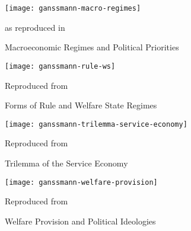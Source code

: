 
 \begin{figure}[htbp]
	\centering
	\texttt{[image: ganssmann-macro-regimes]}
	\caption{Macroeconomic Regimes and Political Priorities}
	\label{fig:ganssmann-macro-regimes}
	\begin{flushleft}
		\scriptsize{\cite{Rodrik2002} as reproduced in \citet[348]{Ganssmann2010}}
	\end{flushleft}
\end{figure}

\begin{figure}[htbp]
	\centering
	\texttt{[image: ganssmann-rule-ws]}
	\caption{Forms of Rule and Welfare State Regimes}
	\label{fig:ganssmann-rule-ws}
	\begin{flushleft}
		\scriptsize{Reproduced from \citet[334]{Ganssmann2010}}
	\end{flushleft}
\end{figure}

\begin{figure}[htbp]
	\centering
	\texttt{[image: ganssmann-trilemma-service-economy]}
	\caption{Trilemma of the Service Economy}
	\label{fig:ganssmann-trilemma-service-economy}
	\begin{flushleft}
		\scriptsize{Reproduced from \citet[341]{Ganssmann2010}}
	\end{flushleft}
\end{figure}

\begin{figure}[htbp]
	\centering
	\texttt{[image: ganssmann-welfare-provision]}
	\caption{Welfare Provision and Political Ideologies}
	\label{fig:ganssmann-welfare-provision}
	\begin{flushleft}
		\scriptsize{Reproduced from \citet[334]{Ganssmann2010}}
	\end{flushleft}
\end{figure}






